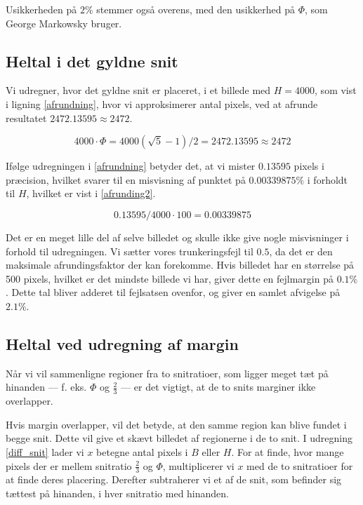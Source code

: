 {Usikkerheden på $2\%$ stemmer også overens, med den usikkerhed
på $\varPhi$, som George Markowsky bruger\cite{Markowsky1992}.

\subsection{Heltal i det gyldne snit}
Vi udregner, hvor det gyldne snit er placeret, i et billede med $H =
4000$, som vist i ligning \eqref{afrundning}, hvor vi approksimerer
antal pixels, ved at afrunde resultatet $2472.13595 \approx 2472$.

\begin{equation}
    4000 \cdot \varPhi = 4000(\sqrt{5}-1)/2 = 2472.13595 \approx 2472
    \label{afrundning}
\end{equation}

Ifølge udregningen i \eqref{afrundning} betyder det, at vi mister
$0.13595$ pixels i præcision, hvilket svarer til en misvisning af
punktet på $0.00339875\%$ i forholdt til $H$, hvilket er vist i
\ref{afrunding2}.

\begin{equation}
    0.13595/4000 \cdot 100 = 0.00339875
    \label{afrundning2}
\end{equation}

Det er en meget lille del af selve billedet og skulle ikke give nogle
misvisninger i forhold til udregningen. Vi sætter vores trunkeringsfejl
til $0.5$, da det er den maksimale afrundingsfaktor der kan forekomme.
Hvis billedet har en størrelse på 500 pixels, hvilket er det mindste
billede vi har, giver dette en fejlmargin på $0.1 \%$. Dette tal bliver
adderet til fejlsatsen ovenfor, og giver en samlet afvigelse på $2.1\%$.

\subsection{Heltal ved udregning af margin}\label{margin_udregning}
Når vi vil sammenligne regioner fra to snitratioer,  som
ligger meget tæt på hinanden --- f. eks.  $\varPhi$ og $\frac{2}{3}$ ---
er det vigtigt, at de to snits marginer ikke overlapper.

Hvis margin overlapper, vil det betyde, at den samme region kan blive
fundet i begge snit. Dette vil give et skævt billedet af regionerne i de
to snit.  I udregning \ref{diff_snit} lader vi $x$ betegne
antal pixels i $B$ eller $H$. For at finde, hvor mange pixels der er
mellem snitratio $\frac{2}{3}$ og $\varPhi$, multiplicerer vi $x$ med de
to snitratioer for at finde deres placering. Derefter subtraherer vi et
af de snit, som befinder sig tættest på hinanden, i hver snitratio med
hinanden.

}

